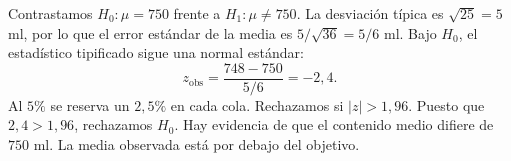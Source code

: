 Contrastamos $H_0:\mu=750$ frente a $H_1:\mu\ne750$. La desviación típica es $\sqrt{25}=5$ ml, por lo que el error estándar de la media es $5/\sqrt{36}=5/6$ ml. Bajo $H_0$, el estadístico tipificado sigue una normal estándar:
\[
z_{\mathrm{obs}}=\frac{748-750}{5/6}=-2{,}4.
\]
Al $5\%$ se reserva un $2{,}5\%$ en cada cola. Rechazamos si $|z|>1{,}96$. Puesto que $2{,}4>1{,}96$, rechazamos $H_0$. Hay evidencia de que el contenido medio difiere de $750$ ml. La media observada está por debajo del objetivo.

